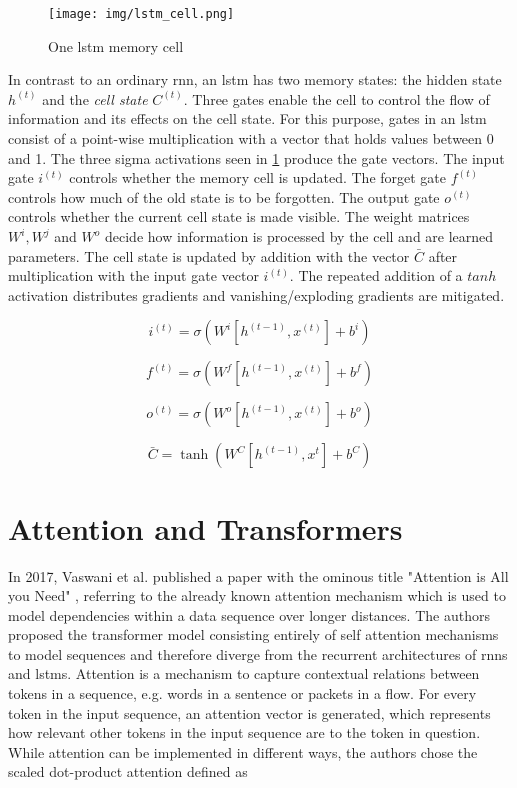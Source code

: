 \begin{figure}[h]
	\centering
	\texttt{[image: img/lstm\_cell.png]}
	\caption{One \gls{lstm} memory cell \cite{rnn_zachary}}
	\label{fig:background:lstm}
\end{figure}

In contrast to an ordinary \gls{rnn}, an \gls{lstm} has two memory states: the hidden state $h^{(t)}$ and the \textit{cell state} $C^{(t)}$. Three gates enable the cell to control the flow of information and its effects on the cell state. For this purpose, gates in an \gls{lstm} consist of a point-wise multiplication with a vector that holds values between 0 and 1. The three sigma activations seen in \ref{fig:background:lstm} produce the gate vectors. The input gate $i^{(t)}$ controls whether the memory cell is updated. The forget gate $f^{(t)}$ controls how much of the old state is to be forgotten. The output gate $o^{(t)}$ controls whether the current cell state is made visible. The weight matrices $W^i, W^j$ and $W^o$ decide how information is processed by the cell and are learned parameters. The cell state is updated by addition with the vector $\bar{C}$ after multiplication with the input gate vector $i^{(t)}$. The repeated addition of a $tanh$ activation distributes gradients and vanishing/exploding gradients are mitigated.

\begin{equation}
i^{(t)} = \sigma(W^i[h^{(t-1)},x^{(t)}] + b^i)
\end{equation}

\begin{equation}
f^{(t)} = \sigma(W^f[h^{(t-1)},x^{(t)}] + b^f)
\end{equation}

\begin{equation}
o^{(t)} = \sigma(W^o[h^{(t-1)},x^{(t)}] + b^o)
\end{equation}

\begin{equation}
\bar{C}=\tanh(W^C[h^{(t-1)},x^{t}]+b^C)
\end{equation}

\section{Attention and Transformers}

In 2017, Vaswani et al. published a paper with the ominous title "Attention is All you Need" \cite{attention_origin}, referring to the already known attention mechanism which is used to model dependencies within a data sequence over longer distances. The authors proposed the transformer model consisting entirely of self attention mechanisms to model sequences and therefore diverge from the recurrent architectures of \glspl{rnn} and \glspl{lstm}. Attention is a mechanism to capture contextual relations between tokens in a sequence, e.g. words in a sentence or packets in a flow. For every token in the input sequence, an attention vector is generated, which represents how relevant other tokens in the input sequence are to the token in question. While attention can be implemented in different ways, the authors chose the scaled dot-product attention defined as 


